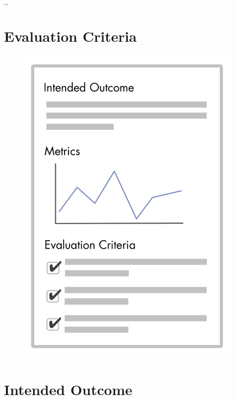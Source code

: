 {\ldots}

\section{Evaluation Criteria}
\label{evaluationcriteria}

\begin{figure}[htbp]
\centering
\includegraphics[keepaspectratio,width=\textwidth,height=0.75\textheight]{img/agreements/outcome-and-criteria.png}
\end{figure}

\section{Intended Outcome}
\label{intendedoutcome}


